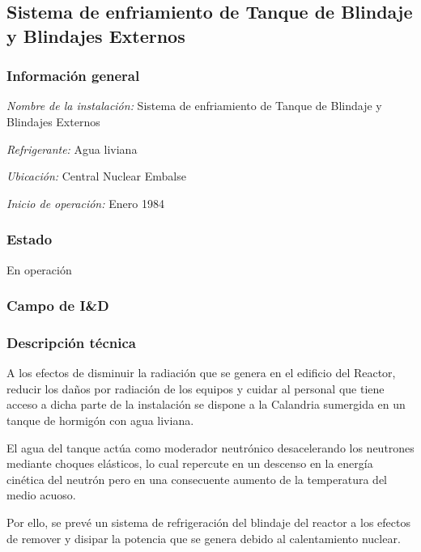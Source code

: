 \documentclass{article}
\begin{document}
\subsection{Sistema de enfriamiento de Tanque de Blindaje y Blindajes Externos}
\subsubsection*{Información general}
\textit{Nombre de la instalación: }Sistema de enfriamiento de Tanque de Blindaje y Blindajes Externos

\textit{Refrigerante: }Agua liviana

\textit{Ubicación: }Central Nuclear Embalse

\textit{Inicio de operación: }Enero 1984

\subsubsection*{Estado}
En operación

\subsubsection*{Campo de I\&D}

\subsubsection*{Descripción técnica}
A los efectos de disminuir la radiación que se genera en el edificio del Reactor, reducir los daños por radiación de los equipos y cuidar al personal que tiene acceso a dicha parte de la instalación se dispone a la Calandria sumergida en un tanque de hormigón con agua liviana.

El agua del tanque actúa como moderador neutrónico desacelerando los neutrones mediante choques elásticos, lo cual repercute en un descenso en la energía cinética del neutrón pero en una consecuente aumento de la temperatura del medio acuoso.

Por ello, se prevé un sistema de refrigeración del blindaje del reactor a los efectos de remover y disipar la potencia que se genera debido al calentamiento nuclear.
\end{document}
